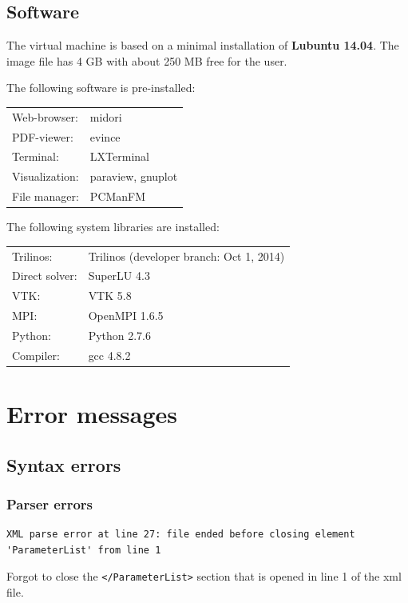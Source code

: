 \documentclass[10pt,fleqn]{book}
\begin{document}
\section{Software}

The virtual machine is based on a minimal installation of \textbf{Lubuntu 14.04}. The image file has 4 GB with about 250 MB free for the user.

The following software is pre-installed:

\begin{tabular}{ll}
Web-browser: & midori \\
PDF-viewer:  & evince \\
Terminal:    & LXTerminal\\
Visualization: & paraview, gnuplot \\
File manager: & PCManFM \\
\end{tabular}

The following system libraries are installed:

\begin{tabular}{ll}
Trilinos:     & Trilinos (developer branch: Oct 1, 2014) \\
Direct solver: & SuperLU 4.3 \\
VTK: & VTK 5.8 \\
MPI: & OpenMPI 1.6.5 \\
Python: & Python 2.7.6 \\
Compiler: & gcc 4.8.2
\end{tabular}


\chapter{Error messages}

\section{Syntax errors}

\subsection{Parser errors}
\begin{cBox}
\begin{lstlisting}
XML parse error at line 27: file ended before closing element 'ParameterList' from line 1
\end{lstlisting}
\end{cBox}
Forgot to close the \verb|</ParameterList>| section that is opened in line 1 of the xml file.
\end{document}
